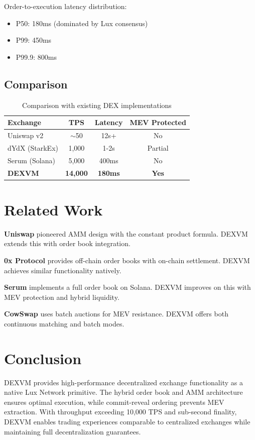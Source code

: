 \documentclass[11pt,a4paper]{article}
\theoremstyle{definition}
\begin{document}
Order-to-execution latency distribution:
\begin{itemize}
    \item P50: 180ms (dominated by Lux consensus)
    \item P99: 450ms
    \item P99.9: 800ms
\end{itemize}

\subsection{Comparison}

\begin{table}[h]
\centering
\begin{tabular}{@{}lccc@{}}
\toprule
Exchange & TPS & Latency & MEV Protected \\
\midrule
Uniswap v2 & $\sim$50 & 12s+ & No \\
dYdX (StarkEx) & 1,000 & 1-2s & Partial \\
Serum (Solana) & 5,000 & 400ms & No \\
\textbf{DEXVM} & \textbf{14,000} & \textbf{180ms} & \textbf{Yes} \\
\bottomrule
\end{tabular}
\caption{Comparison with existing DEX implementations}
\end{table}

\section{Related Work}

\textbf{Uniswap} pioneered AMM design with the constant product formula. DEXVM extends this with order book integration.

\textbf{0x Protocol} provides off-chain order books with on-chain settlement. DEXVM achieves similar functionality natively.

\textbf{Serum} implements a full order book on Solana. DEXVM improves on this with MEV protection and hybrid liquidity.

\textbf{CowSwap} uses batch auctions for MEV resistance. DEXVM offers both continuous matching and batch modes.

\section{Conclusion}

DEXVM provides high-performance decentralized exchange functionality as a native Lux Network primitive. The hybrid order book and AMM architecture ensures optimal execution, while commit-reveal ordering prevents MEV extraction. With throughput exceeding 10,000 TPS and sub-second finality, DEXVM enables trading experiences comparable to centralized exchanges while maintaining full decentralization guarantees.
\end{document}
